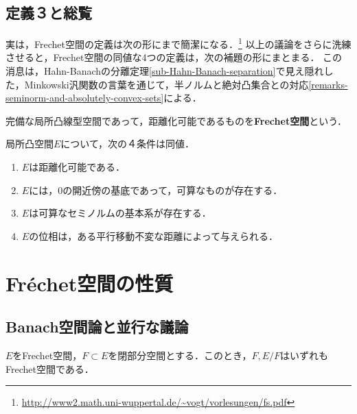 \documentclass[uplatex,dvipdfmx]{jsreport}
\begin{document}
\subsection{定義３と総覧}

\begin{tcolorbox}[colframe=ForestGreen, colback=ForestGreen!10!white,breakable,colbacktitle=ForestGreen!40!white,coltitle=black,fonttitle=\bfseries\sffamily,
title=]
    実は，Frechet空間の定義は次の形にまで簡潔になる．\footnote{\url{http://www2.math.uni-wuppertal.de/~vogt/vorlesungen/fs.pdf}}
    以上の議論をさらに洗練させると，Frechet空間の同値な4つの定義は，次の補題の形にまとまる．
    この消息は，Hahn-Banachの分離定理\ref{sub-Hahn-Banach-separation}で見え隠れした，Minkowski汎関数の言葉を通じて，半ノルムと絶対凸集合との対応\ref{remarks-seminorm-and-absolutely-convex-sets}による．
\end{tcolorbox}

\begin{definition}
    完備な局所凸線型空間であって，距離化可能であるものを\textbf{Frechet空間}という．
\end{definition}

\begin{lemma}[Frechet空間の特徴付け]
    局所凸空間$E$について，次の４条件は同値．
    \begin{enumerate}
        \item $E$は距離化可能である．
        \item $E$には，$0$の開近傍の基底であって，可算なものが存在する．
        \item $E$は可算なセミノルムの基本系が存在する．
        \item $E$の位相は，ある平行移動不変な距離によって与えられる．
    \end{enumerate}
\end{lemma}

\section{Fréchet空間の性質}

\subsection{Banach空間論と並行な議論}

\begin{proposition}
    $E$をFrechet空間，$F\subset E$を閉部分空間とする．このとき，$F,E/F$はいずれもFrechet空間である．
\end{proposition}
\end{document}
